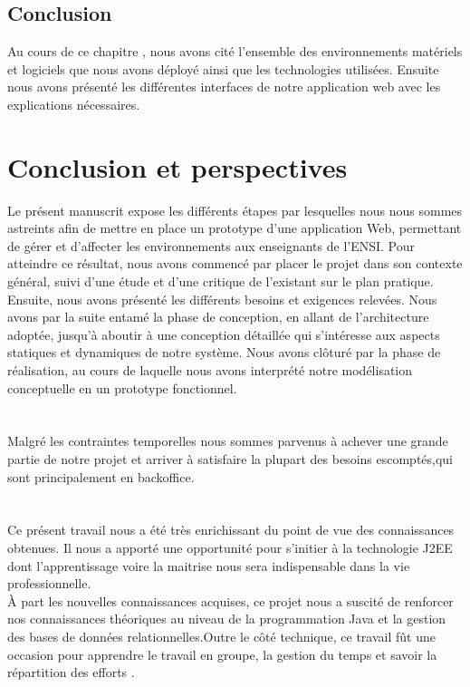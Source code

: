 \documentclass[a4paper,12pt,oneside]{report}
\begin{document}
  \section{Conclusion}
  Au cours de ce chapitre , nous avons cité l'ensemble des environnements matériels et logiciels que nous avons déployé ainsi que les technologies utilisées. Ensuite nous avons présenté les différentes interfaces de notre application web avec les explications nécessaires. 
\chapter*{Conclusion et perspectives}
Le présent manuscrit expose les différents étapes par lesquelles nous nous sommes astreints afin de mettre en place un prototype d'une application Web, permettant de gérer et d'affecter les environnements aux enseignants de l'ENSI. Pour atteindre ce résultat, nous avons commencé par placer le projet dans son contexte général, suivi d'une étude et d'une critique de l'existant sur le plan pratique. Ensuite, nous avons présenté les différents besoins et exigences relevées. Nous avons par la suite entamé la phase de conception, en allant de l'architecture adoptée, jusqu'à aboutir à une conception détaillée qui s'intéresse aux aspects statiques et dynamiques de notre système. Nous avons clôturé par la phase de réalisation, au cours de laquelle nous avons interprété notre modélisation conceptuelle en un prototype fonctionnel.
\\
\\
\\
Malgré les contraintes temporelles nous sommes parvenus à achever une grande partie de notre projet  et arriver à satisfaire la plupart des besoins escomptés,qui sont principalement en backoffice.\\
\\
\\
Ce présent travail nous a été très enrichissant du point de vue des connaissances obtenues. Il nous a apporté une opportunité pour s'initier à la technologie J2EE dont l'apprentissage voire la maitrise nous sera indispensable dans la vie professionnelle.\\  À part les nouvelles connaissances acquises, ce projet nous a suscité de renforcer nos connaissances théoriques au niveau de la programmation Java et la gestion des bases de données relationnelles.Outre le  côté technique, ce travail fût une occasion pour apprendre le travail en groupe, la gestion du temps et  savoir la répartition des efforts .
\end{document}
